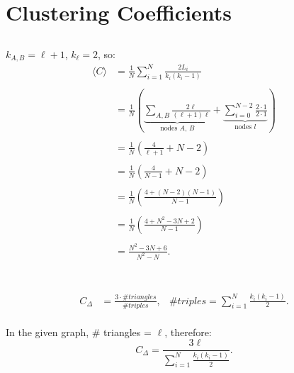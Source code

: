\documentclass {article}
\begin{document}
\section{Clustering Coefficients}
\subsection{}

$ k_{A, B} = \ell + 1$, $k_{\ell} = 2 $, so:
\begin{align*}
\langle C \rangle & = \frac{ 1 }{ N } \sum\limits_{ i=1 }^N \frac{ 2 L_i }{ k_i (k_i - 1) } \\ \\
& = \frac{ 1 }{ N } \left( \underbrace{\sum\limits_{ A,B } \frac{ 2 \ell }{ (\ell + 1) \ell }}_\text{nodes $A$, $B$} + \underbrace{ \sum\limits_{ i=0 }^{N-2} \frac{ 2 \cdot 1 }{ 2 \cdot 1 }}_\text{nodes $l$} \right) \\ \\
& = \frac{ 1 }{ N } \left( \frac{ 4 }{ \ell + 1 } + N - 2  \right) \\ \\
& = \frac{ 1 }{ N } \left( \frac{ 4 }{ N - 1 } + N - 2  \right) \\ \\
& = \frac{ 1 }{ N } \left( \frac{ 4 + (N - 2)(N - 1) }{ N - 1 } \right) \\ \\
& = \frac{ 1 }{ N } \left( \frac{ 4 + N^2 - 3N + 2 }{ N - 1 }  \right) \\ \\
& = \frac{ N^2 - 3N + 6 }{ N^2 - N }. \\ \\
\end{align*}

\subsection{}
\begin{align*}
C_{\Delta} &= \frac{ 3 \cdot \# triangles }{ \# triples },
& \# triples = \sum\limits_{ i=1 }^N \frac{ k_i (k_i - 1) }{ 2 }.\\
\end{align*}

In the given graph, $ \# $ triangles = $ \ell $, therefore:
$$ C_{\Delta} = \frac{ 3 \ell }{ \sum\limits_{ i=1 }^N \frac{ k_i (k_i - 1) }{ 2 }}. $$
 
\end{document}

